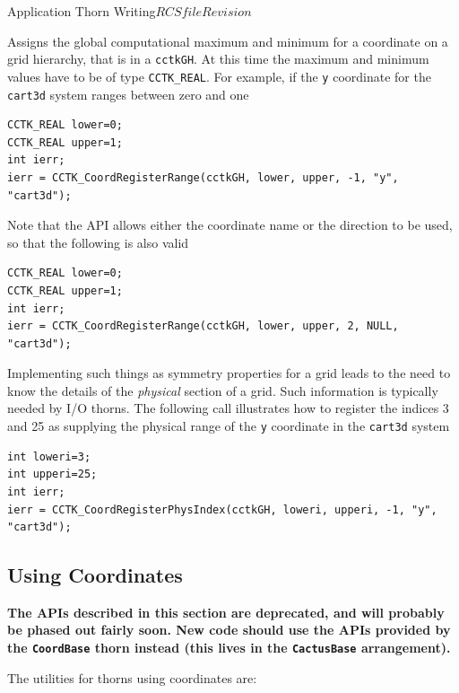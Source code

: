 \begin{cactuspart}{Application Thorn Writing}{$RCSfile$}{$Revision$}
\begin{Lentry}
Assigns the global computational maximum and minimum for a coordinate
on a grid hierarchy, that is in a \texttt{cctkGH}. At this time the
maximum and minimum values have to be of type \texttt{CCTK\_REAL}. For
example, if the \texttt{y} coordinate for the \texttt{cart3d} system ranges
between zero and one
%
\begin{verbatim}
CCTK_REAL lower=0;
CCTK_REAL upper=1;
int ierr;
ierr = CCTK_CoordRegisterRange(cctkGH, lower, upper, -1, "y", "cart3d");
\end{verbatim}
%
Note that the API allows either the coordinate name or the direction to
be used, so that the following is also valid
%
\begin{verbatim}
CCTK_REAL lower=0;
CCTK_REAL upper=1;
int ierr;
ierr = CCTK_CoordRegisterRange(cctkGH, lower, upper, 2, NULL, "cart3d");
\end{verbatim}

\item[\texttt{CCTK\_CoordRegisterPhysIndex}]

Implementing such things as symmetry properties for a grid leads to
the need to know the details of the \emph{physical} section of a grid.
Such information is typically needed by I/O thorns. The following call
illustrates how to register the
indices 3 and 25 as supplying the physical range of the \texttt{y}
coordinate in the \texttt{cart3d} system
%
\begin{verbatim}
int loweri=3;
int upperi=25;
int ierr;
ierr = CCTK_CoordRegisterPhysIndex(cctkGH, loweri, upperi, -1, "y", "cart3d");
\end{verbatim}



\end{Lentry}

\subsection{Using Coordinates}

\textbf{The APIs described in this section are deprecated, and will
probably be phased out fairly soon.
New code should use the APIs provided by the \texttt{CoordBase} thorn
instead (this lives in the \texttt{CactusBase} arrangement).}

The utilities for thorns using coordinates are:

\begin{Lentry}

\item[\texttt{CCTK\_NumCoordSystems}]


\end{Lentry}
\end{cactuspart}

